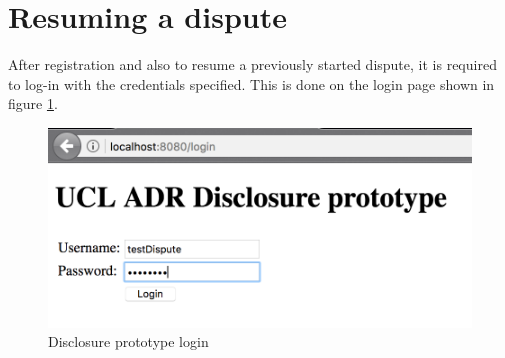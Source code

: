 \documentclass[12pt,msc,a4paper,oneside]{ucl_thesis}
\begin{document}
\section{Resuming a dispute}
After registration and also to resume a previously started dispute, it is required to log-in with the credentials specified. This is done on the login page shown in figure \ref{fig:proto_login}.

\begin{figure}[H]
    \includegraphics[width=1.0\textwidth]{./figures/proto_login.png}
    \caption{Disclosure prototype login}
    \label{fig:proto_login}
\end{figure}
\end{document}

